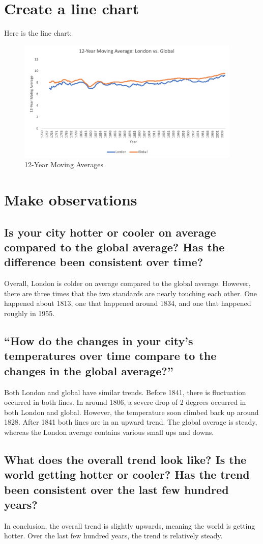 \documentclass{article}
\begin{document}
\section{Create a line chart}
Here is the line chart:
\begin{figure}[H]
  \begin{center}
    \includegraphics[width=0.95\textwidth]{moving_averages}
    \caption{12-Year Moving Averages}
  \end{center}
\end{figure}


\section{Make observations}
\subsection{Is your city hotter or cooler on average compared to the global average? Has the difference been consistent over time?}
Overall, London is colder on average compared to the global average. However, there are three times that the two standards are nearly touching each other. One happened about 1813, one that happened around 1834, and one that happened roughly in 1955.

\subsection{“How do the changes in your city’s temperatures over time compare to the changes in the global average?”}
Both London and global have similar trends. Before 1841, there is fluctuation occurred in both lines. In around 1806, a severe drop of 2 degrees occurred in both London and global. However, the temperature soon climbed back up around 1828. After 1841 both lines are in an upward trend. The global average is steady, whereas the London average contains various small ups and downs.

\subsection{What does the overall trend look like? Is the world getting hotter or cooler? Has the trend been consistent over the last few hundred years?}
In conclusion, the overall trend is slightly upwards, meaning the world is getting hotter. Over the last few hundred years, the trend is relatively steady.
\end{document}
